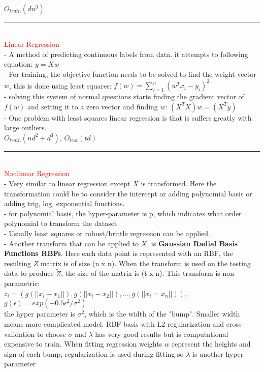 \documentclass[8pt]{extarticle}
\begin{document}
\begin{multicols*}{2}
\\
$O_{train}(dn^3)$
\\
\rule{\linewidth}{0.5mm} 
\\
\textcolor{red}{Linear Regression}
\\
- A method of predicting continuous labels from data. it attempts to following equation:
$y = Xw$
\\
- For training, the objective function needs to be solved to find the weight vector $w$, this is done using least squares:
$f(w) = \sum_{i=1}^{n}(w^Tx_i - y_i)^2$
\\
- solving this system of normal questions starts finding the gradient vector of $f(w)$ and setting it to a zero vector and finding $w$: $(X^TX)w = (X^Ty)$
\\
- One problem with least squares linear regression is that is suffers greatly with large outliers.
\\
$O_{train}(nd^2 + d^3)$, $O_{test}(td)$
\\
\rule{\linewidth}{0.5mm} 
\\
\textcolor{red}{Nonlinear Regression}
\\
- Very similar to linear regression except $X$ is transformed. Here the transformation could be to consider the intercept or adding polynomial basis or adding trig, log, exponential functions.
\\
- for polynomial basis, the hyper-parameter is p, which indicates what order polynomial to transform the dataset
\\
- Usually least squares or robust/brittle regression can be applied.
\\
- Another transform that can be applied to $X$, is \textbf{Gaussian Radial Basis Functions RBFs}. Here each data point is represented with an RBF, the resulting $Z$ matrix is of size (n x n). When the transform is used on the testing data to produce $\tilde{Z}$, the size of the matrix is (t x n). This transform is non-parametric:
\\
$z_i = (g(||x_i-x_1||), g(||x_i-x_2||), ..., g(||x_i=x_n||))$, $g(\epsilon) = exp(-0.5\epsilon^2/\sigma^2)$
\\
the hyper parameter is $\sigma^2$, which is the width of the "bump". Smaller width means more complicated model. RBF basis with L2 regularization and cross-validation to choose $\sigma$ and $\lambda$ has very good results but is computational expensive to train. When fitting regression weights $w$ represent the heights and sign of each bump, regularization is used during fitting so $\lambda$ is another hyper parameter

\end{multicols*}
\end{document}
